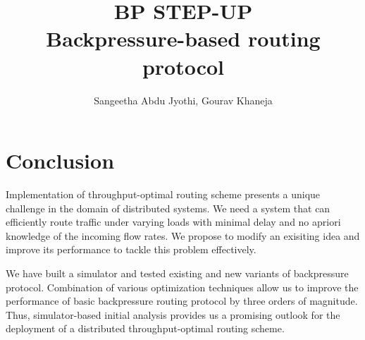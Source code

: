 \documentclass[12pt, a4paper, twocolumn]{article}
\begin{document}
\title{\bf{BP STEP-UP \\ Backpressure-based routing protocol}}
\author{Sangeetha Abdu Jyothi, Gourav Khaneja}
\date{}
\maketitle







%


\section{Conclusion}
Implementation of throughput-optimal routing scheme presents a unique challenge in the domain of distributed systems. We need a system that can efficiently route traffic under varying loads with minimal delay and no apriori knowledge of the incoming flow rates. We propose to modify an exisiting idea and improve its performance to tackle this problem effectively.

We have built a simulator and tested existing and new variants of backpressure protocol. Combination of various optimization techniques allow us to improve the performance of basic backpressure routing protocol by three orders of magnitude. Thus, simulator-based initial analysis provides us a promising outlook for the deployment of a distributed throughput-optimal routing scheme. 
%


\end{document}
